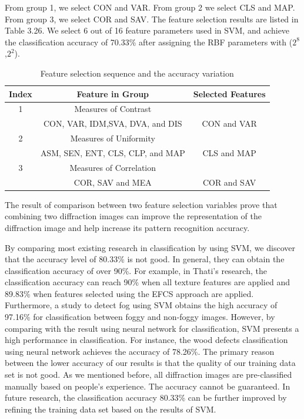 From group 1, we select CON and VAR. From group 2 we select CLS and MAP. From group 3, we select COR and SAV. The feature selection results are listed in Table 3.26. We select 6 out of 16 feature parameters used in SVM, and achieve the classification accuracy of 70.33\% after assigning the RBF parameters with ($2^8$,$2^2$). 
\begin{table}[!b]
\centering
\renewcommand{\arraystretch}{0.5}
\begin{tabular}{|| c | c | c ||}
\hline
Index & Feature in Group & Selected Features \\
\hline
1 & Measures of Contrast & \\
  & CON, VAR, IDM,SVA, DVA, and DIS & CON and VAR \\
  \hline
2 & Measures of Uniformity & \\
  & ASM, SEN, ENT, CLS, CLP, and MAP & CLS and MAP \\
  \hline
3 & Measures of Correlation & \\
  & COR, SAV and MEA & COR and SAV \\
\hline
\end{tabular}
\caption{Feature selection sequence and the accuracy variation}
\end{table}
The result of comparison between two feature selection variables prove that combining two diffraction images can improve the representation of the diffraction image and help increase its pattern recognition accuracy. \par
By comparing most existing research in classification by using SVM, we discover that the accuracy level of 80.33\% is not good. In general, they can obtain the classification accuracy of over 90\%. For example, in Thati's research\cite{Thati}, the classification accuracy can reach 90\% when all texture features are applied and 89.83\% when features selected using the EFCS approach are applied. Furthermore, a study to detect fog using SVM obtains the high accuracy of 97.16\% for classification between foggy and non-foggy images\cite{Rakesh}. However, by comparing with the result using neural network for classification, SVM presents a high performance in classification. For instance, the wood defects classification using neural network achieves the accuracy of 78.26\%\cite{Qayyum}. The primary reason between the lower accuracy of our results is that the quality of our training data set is not good. As we mentioned before, all diffraction images are pre-classified manually based on people's experience. The accuracy cannot be guaranteed. In future research, the classification accuracy 80.33\% can be further improved by refining the training data set based on the results of SVM.  
